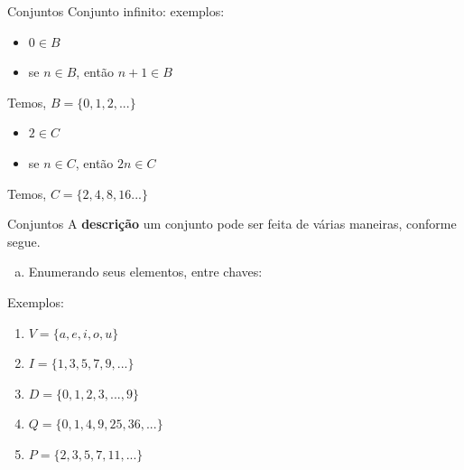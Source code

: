 \documentclass[aspectratio=169]{beamer}
\begin{document}
\begin{frame}{Conjuntos}
    Conjunto infinito: exemplos:

    \begin{itemize}
        \item $0 \in B $
        \item se $n \in B$, então $n + 1 \in B$
    \end{itemize}
    
    \vspace{2mm}
Temos, $B=\{0,1,2,...\}$

\vspace{4mm}
\begin{itemize}
    \item $2 \in C $
    \item se $n \in C$, então $2n \in C$
\end{itemize}

\vspace{2mm}
Temos, $C=\{2,4,8,16...\}$

\end{frame}

\begin{frame}{Conjuntos}
    A \textbf{descrição} um conjunto pode ser feita de várias maneiras, conforme segue.
  
    \begin{enumerate}[a)]
        \item Enumerando seus elementos, entre chaves:
    \end{enumerate}

    \vspace{4mm}

Exemplos:

\begin{enumerate}
    \item $V = \{ a, e, i, o, u\}$
    \item $I = \{1, 3, 5, 7, 9, ...\}$
    \item $D = \{0, 1, 2, 3, ..., 9\}$
    \item $Q = \{0, 1, 4, 9, 25, 36, ...\}$
    \item $P = \{2, 3, 5, 7, 11, ...\}$
\end{enumerate}

\end{frame}
\end{document}
